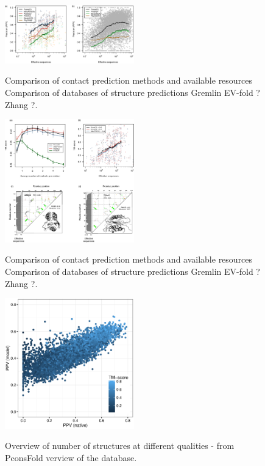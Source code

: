 \documentclass[a4,center,fleqn]{NAR}
\begin{document}
\begin{figure}[t]
\begin{center}
\end{center}
\caption{Comparison of contact prediction methods and available resources
Comparison of databases of structure predictions
Gremlin
EV-fold ?
Zhang ?.}
    \includegraphics[width=0.5\textwidth]{figures/fig1_PNAS.eps}
\label{fig:comparison}

\end{figure}
\begin{figure}[t]
\begin{center}
\end{center}
\caption{Comparison of contact prediction methods and available resources
Comparison of databases of structure predictions
Gremlin
EV-fold ?
Zhang ?.}
    \includegraphics[width=0.5\textwidth]{figures/fig4_PNAS.eps}
\label{fig:comparison}
\end{figure}


\begin{figure}[t]
\begin{center}
\end{center}
\caption{Overview of number of structures at different qualities - from PconsFold
verview of the database.}
    \includegraphics[width=0.5\textwidth]{figures/fig_pfam_ppv_native_vs_model.eps}
\label{fig:overview}
\end{figure}
\end{document}
